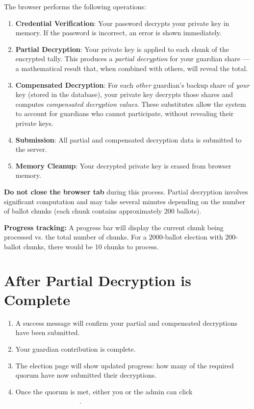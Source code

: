 \documentclass[12pt,a4paper]{book}
\newcommand{\uibutton}[1]{\colorbox{guardgreen}{\textcolor{white}{\small\textbf{#1}}}}
\begin{document}
The browser performs the following operations:

\begin{enumerate}
  \item \textbf{Credential Verification}: Your password decrypts your private key in memory. If the password is incorrect, an error is shown immediately.
  \item \textbf{Partial Decryption}: Your private key is applied to each chunk of the encrypted tally. This produces a \emph{partial decryption} for your guardian share --- a mathematical result that, when combined with others, will reveal the total.
  \item \textbf{Compensated Decryption}: For each \emph{other} guardian's backup share of \emph{your} key (stored in the database), your private key decrypts those shares and computes \emph{compensated decryption values}. These substitutes allow the system to account for guardians who cannot participate, without revealing their private keys.
  \item \textbf{Submission}: All partial and compensated decryption data is submitted to the server.
  \item \textbf{Memory Cleanup}: Your decrypted private key is erased from browser memory.
\end{enumerate}

\begin{tcolorbox}[warnbox]
\textbf{Do not close the browser tab} during this process. Partial decryption involves significant computation and may take several minutes depending on the number of ballot chunks (each chunk contains approximately 200 ballots).
\end{tcolorbox}

\begin{tcolorbox}[notebox]
\textbf{Progress tracking:} A progress bar will display the current chunk being processed vs. the total number of chunks. For a 2000-ballot election with 200-ballot chunks, there would be 10 chunks to process.
\end{tcolorbox}

\section{After Partial Decryption is Complete}

\begin{enumerate}
  \item A success message will confirm your partial and compensated decryptions have been submitted.
  \item Your guardian contribution is complete.
  \item The election page will show updated progress: how many of the required quorum have now submitted their decryptions.
  \item Once the quorum is met, either you or the admin can click \uibutton{Combine Decryption Shares}.
\end{enumerate}
\end{document}
